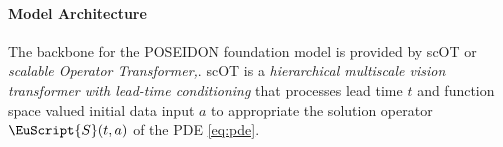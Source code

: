 \documentclass[reqno,10pt]{amsart}
\theoremstyle{plain}
\theoremstyle{definition}
\newcommand{\eus}[1]{\EuScript{#1}}
\begin{document}
\paragraph{\bf Model Architecture} The backbone for the {\large P}OSEIDON foundation model is provided by scOT or {\it scalable Operator Transformer,}. scOT is a {\it hierarchical multiscale vision transformer with lead-time conditioning} that processes lead time $t$ and function space valued initial data input $a$ to appropriate the solution operator $\eus S(t,a)$ of the PDE \ref{eq:pde}.


\end{document}

